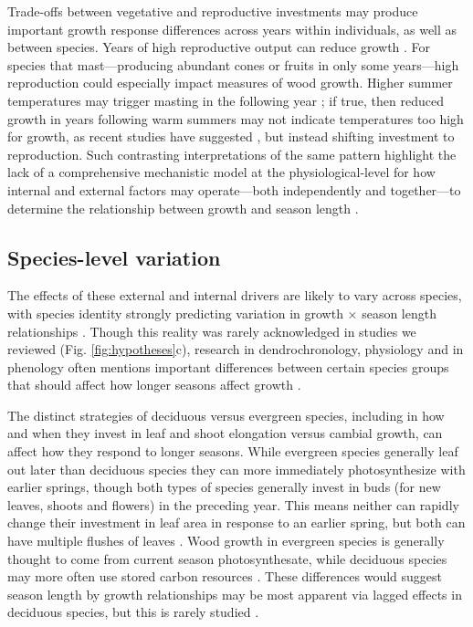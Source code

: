 \documentclass[11pt]{article}
\newcommand{\R}[1]{\label{#1}\linelabel{#1}}
\begin{document}
Trade-offs between vegetative and reproductive investments may produce important growth response differences across years within individuals, as well as between species. Years of high reproductive output can reduce growth \citep{thomas2011bookchptr,hacket2016tree}. For species that mast---producing abundant cones or fruits in only some years---high reproduction could especially impact measures of wood growth. Higher summer temperatures may trigger masting in the following year \citep{hacket2016tree,hacket2016consistent}; if true, then reduced growth in years following warm summers may not indicate temperatures too high for growth, as recent studies have suggested \citep[e.g.][]{gantois2022new,dow2022warm}, but instead shifting investment to reproduction. Such contrasting interpretations of the same pattern highlight the lack of a comprehensive mechanistic model at the physiological-level for how internal and external factors may operate---both independently and together---to determine the relationship between growth and season length \citep[see Box,][]{korner2015paradigm}\R{morebox}\R{forbigK}.

\subsection*{Species-level variation}
The effects of these external and internal drivers are likely to vary across species, with species identity strongly predicting variation in growth $\times$ season length relationships \citep[e.g.][]{cuny2012life,michelot2012comparing}. Though this reality was rarely acknowledged in studies we reviewed (Fig. \ref{fig:hypotheses}c), research in dendrochronology, physiology and in phenology often mentions important differences between certain species groups that should affect how longer seasons affect growth \citep{camarero2015or,fu2019nutrient,puchalka2024tree}. 

The distinct strategies of deciduous versus evergreen species, including in how and when they invest in leaf and shoot elongation versus cambial growth, can affect how they respond to longer seasons. While evergreen species generally leaf out later than deciduous species they can more immediately photosynthesize with earlier springs, though both types of species generally invest in buds (for new leaves, shoots and flowers) in the preceding year. This means neither can rapidly change their investment in leaf area in response to an earlier spring, but both can have multiple flushes of leaves \citep{day2011regulation,soolanayakanahally2013timing}. Wood growth in evergreen species is generally thought to come from current season photosynthesate, while deciduous species may more often use stored carbon resources \citep{gordon1968seasonal,monson2018finding}. These differences would suggest season length by growth relationships
may be most apparent via lagged effects in deciduous species, but this is rarely studied  \citep[and not clearly supported to date, see][]{coulthard2020limits,klesse2023legacy}. %
\end{document}
